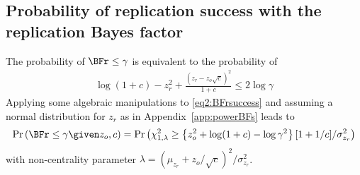 \begin{subappendices}
\section{Probability of replication success with the replication Bayes factor}
\label{app:powerBFr}
The probability of $\BFr \leq \gamma$ is equivalent to the probability of
\begin{align}
  \label{eq2:BFrsuccess}
  \log(1 + c) - z_{r}^{2} + \frac{(z_{r} - z_{o}\sqrt{c})^{2}}{1 + c}
  \leq  2 \log \gamma
\end{align}
Applying some algebraic manipulations to \eqref{eq2:BFrsuccess} and assuming a
normal distribution for $z_{r}$ as in Appendix~\ref{app:powerBFs} leads to
\begin{align*}
  \Pr\left(\BFr \leq \gamma \given z_o, c\right) =
  \Pr\left(\chi^2_{1,\lambda} \geq \left\{z_{o}^{2} + \log(1 + c) - \log \gamma^{2}
  \right\} [1 + 1/c] / \sigma^2_{z_r}\right)
\end{align*}
with non-centrality parameter $\lambda = (\mu_{z_r} + z_{o}/\sqrt{c})^2/\sigma^2_{z_r}$.

\end{subappendices}



